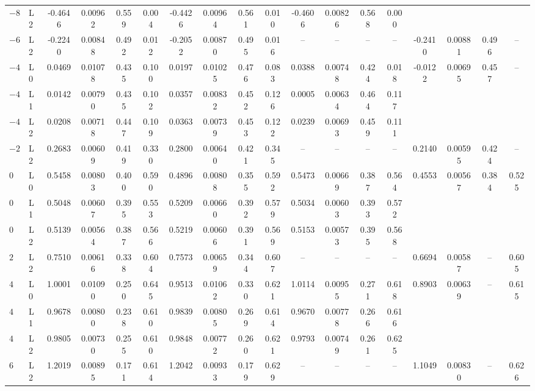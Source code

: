 \documentclass[10pt]{article}
\begin{document}
\begin{table}[H]
\begin{tabular}{ll cccc cccc cccc cccc}
    $-8$ & L2 & -0.4646 & 0.00962 & 0.559 & 0.004 & -0.4426 & 0.00964 & 0.561 & 0.010 & -0.4606 & 0.00826 & 0.568 & 0.000 &  &  &  &  \\
    \addlinespace
    $-6$ & L2 & -0.2240 & 0.00848 & 0.492 & 0.012 & -0.2052 & 0.00870 & 0.495 & 0.016 & -- & -- & -- & -- & -0.2410 & 0.00881 & 0.496 & -- \\
    \addlinespace
    $-4$ & L0 & 0.0469 & 0.01078 & 0.435 & 0.100 & 0.0197 & 0.01025 & 0.476 & 0.083 & 0.0388 & 0.00748 & 0.424 & 0.018 & -0.0122 & 0.00695 & 0.457 & -- \\
    $-4$ & L1 & 0.0142 & 0.00790 & 0.435 & 0.102 & 0.0357 & 0.00832 & 0.452 & 0.126 & 0.0005 & 0.00634 & 0.464 & 0.117 &  &  &  &  \\
    $-4$ & L2 & 0.0208 & 0.00718 & 0.447 & 0.109 & 0.0363 & 0.00739 & 0.453 & 0.122 & 0.0239 & 0.00693 & 0.459 & 0.111 &  &  &  &  \\
    \addlinespace
    $-2$ & L2 & 0.2683 & 0.00609 & 0.419 & 0.330 & 0.2800 & 0.00640 & 0.421 & 0.345 & -- & -- & -- & -- & 0.2140 & 0.00595 & 0.424 & -- \\
    \addlinespace
    $0$ & L0 & 0.5458 & 0.00803 & 0.400 & 0.590 & 0.4896 & 0.00808 & 0.355 & 0.592 & 0.5473 & 0.00669 & 0.387 & 0.564 & 0.4553 & 0.00567 & 0.384 & 0.525 \\
    $0$ & L1 & 0.5048 & 0.00607 & 0.395 & 0.553 & 0.5209 & 0.00660 & 0.392 & 0.579 & 0.5034 & 0.00603 & 0.393 & 0.572 &  &  &  &  \\
    $0$ & L2 & 0.5139 & 0.00564 & 0.387 & 0.566 & 0.5219 & 0.00606 & 0.391 & 0.569 & 0.5153 & 0.00573 & 0.395 & 0.568 &  &  &  &  \\
    \addlinespace
    $2$ & L2 & 0.7510 & 0.00616 & 0.338 & 0.604 & 0.7573 & 0.00659 & 0.344 & 0.607 & -- & -- & -- & -- & 0.6694 & 0.00587 & -- & 0.605 \\
    \addlinespace
    $4$ & L0 & 1.0001 & 0.01090 & 0.250 & 0.645 & 0.9513 & 0.01062 & 0.330 & 0.621 & 1.0114 & 0.00955 & 0.271 & 0.618 & 0.8903 & 0.00639 & -- & 0.615 \\
    $4$ & L1 & 0.9678 & 0.00800 & 0.238 & 0.610 & 0.9839 & 0.00805 & 0.269 & 0.614 & 0.9670 & 0.00778 & 0.266 & 0.616 &  &  &  &  \\
    $4$ & L2 & 0.9805 & 0.00730 & 0.255 & 0.610 & 0.9848 & 0.00772 & 0.260 & 0.621 & 0.9793 & 0.00749 & 0.261 & 0.625 &  &  &  &  \\
    \addlinespace
    $6$ & L2 & 1.2019 & 0.00895 & 0.171 & 0.614 & 1.2042 & 0.00933 & 0.179 & 0.629 & -- & -- & -- & -- & 1.1049 & 0.00830 & -- & 0.626 \\

\end{tabular}
\end{table}
\end{document}
